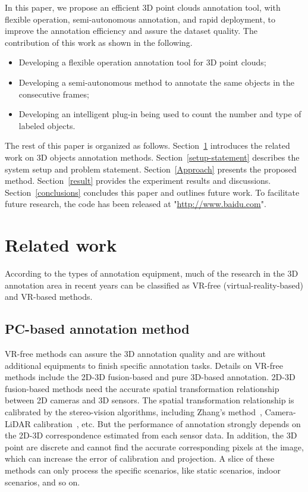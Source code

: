 \documentclass[letterpaper, 10 pt, conference]{ieeeconf}  %
\begin{document}
In this paper, we propose an efficient 3D point clouds annotation tool, with flexible operation, semi-autonomous annotation, and rapid deployment, to improve the annotation efficiency and assure the dataset quality. The contribution of this work as shown in the following.
\begin{itemize}
  \item Developing a flexible operation annotation tool for 3D point clouds;
  \item Developing a semi-autonomous method to annotate the same objects in the consecutive frames;
  \item Developing an intelligent plug-in being used to count the number and type of labeled objects.
\end{itemize}

The rest of this paper is organized as follows. Section~\ref{Realtedwork} introduces the related work on 3D objects annotation methods.
Section~\ref{setup-statement} describes the system setup and problem statement. Section~\ref{Approach} presents the proposed method.
Section~\ref{result} provides the experiment results and discussions. Section~\ref{conclusions} concludes this paper and outlines future work. To facilitate future research, the code has been released at "\url{http://www.baidu.com}".
\section{Related work}
\label{Realtedwork}
According to the types of annotation equipment, much of the research in the 3D annotation area in recent years can be classified as VR-free (virtual-reality-based) and VR-based methods.
\subsection{PC-based annotation method}
VR-free methods can assure the 3D annotation quality  and are without additional equipments to finish specific annotation tasks.
Details on VR-free methods include the 2D-3D fusion-based and pure 3D-based annotation.
2D-3D fusion-based methods need the accurate spatial transformation relationship between 2D cameras and 3D sensors.
The spatial transformation relationship is calibrated by the stereo-vision algorithms, including Zhang's method~\cite{zhangzhegnyou}, Camera-LiDAR calibration~\cite{roadCalibration}, etc.
But the performance of annotation strongly depends on the 2D-3D correspondence estimated from each sensor data. In addition, the 3D point are discrete and cannot find the accurate corresponding pixels at the image, which can increase the error of calibration and projection. A slice of these methods can only process the specific scenarios, like static scenarios, indoor scenarios, and so on.
\end{document}
